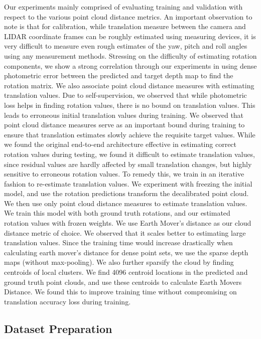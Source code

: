 \documentclass[letterpaper, 10 pt, conference]{ieeeconf}  %
\begin{document}
Our experiments mainly comprised of evaluating training and validation with respect to the various point cloud distance metrics. 
An important observation to note is that for calibration, while translation measure between the camera and LIDAR coordinate frames can be roughly estimated using measuring devices, it is very difficult to measure even rough estimates of the yaw, pitch and roll angles using any measurement methods. Stressing on the difficulty of estimating rotation components, we show a strong correlation through our experiments in using dense photometric error between the predicted and target depth map to find the rotation matrix.  
We also associate point cloud distance measures with estimating translation values. Due to self-supervision, we observed that while photometric loss helps in finding rotation values, there is no bound on translation values. This leads to erroneous initial translation values during training. We observed that point cloud distance measures serve as an important bound during training to ensure that translation estimates slowly achieve the requisite target values. 
While we found the original end-to-end architecture effective in estimating correct rotation values during testing, we found it difficult to estimate translation values, since residual values are hardly affected by small translation changes, but highly sensitive to erroneous rotation values. To remedy this, we train in an iterative fashion to re-estimate translation values. We experiment with freezing the initial model, and use the rotation predictions transform the decalibrated point cloud. We then use only point cloud distance measures to estimate translation values. We train this model with both ground truth rotations, and our estimated rotation values with frozen weights. We use Earth Mover's distance as our cloud distance metric of choice. We observed that it scales better to estimating large translation values. Since the training time would increase drastically when calculating earth mover's distance for dense point sets, we use the sparse depth maps (without max-pooling). We also further sparsify the cloud by finding centroids of local clusters. We find 4096 centroid locations in the predicted and ground truth point clouds, and use these centroids to calculate Earth Movers Distance. We found this to improve training time without compromising on translation accuracy loss during training. 

\subsection{Dataset Preparation}
\end{document}
